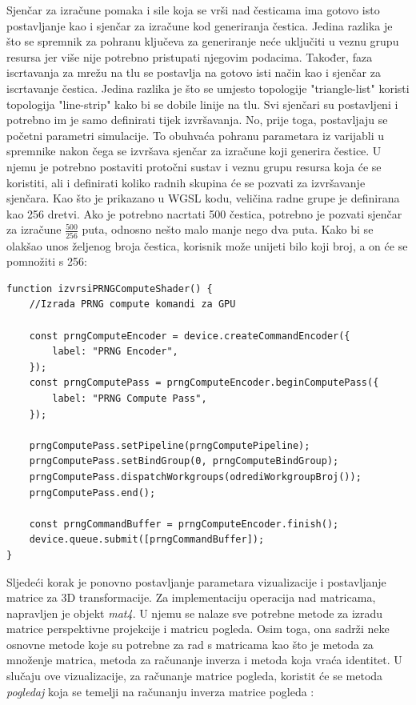 \documentclass{foi}
\begin{document}
Sjenčar za izračune pomaka i sile koja se vrši nad česticama ima gotovo isto postavljanje kao i sjenčar za izračune kod generiranja čestica. Jedina razlika je što se spremnik za pohranu ključeva za generiranje neće uključiti u veznu grupu resursa jer više nije potrebno pristupati njegovim podacima. Također, faza iscrtavanja za mrežu na tlu se postavlja na gotovo isti način kao i sjenčar za iscrtavanje čestica. Jedina razlika je što se umjesto topologije "triangle-list" koristi topologija "line-strip" kako bi se dobile linije na tlu. Svi sjenčari su postavljeni i potrebno im je samo definirati tijek izvršavanja. No, prije toga, postavljaju se početni parametri simulacije. To obuhvaća pohranu parametara iz varijabli u spremnike nakon čega se izvršava sjenčar za izračune koji generira čestice. U njemu je potrebno postaviti protočni sustav i veznu grupu resursa koja će se koristiti, ali i definirati koliko radnih skupina će se pozvati za izvršavanje sjenčara. Kao što je prikazano u WGSL kodu, veličina radne grupe je definirana kao 256 dretvi. Ako je potrebno nacrtati 500 čestica, potrebno je pozvati sjenčar za izračune $\frac{500}{256}$ puta, odnosno nešto malo manje nego dva puta. Kako bi se olakšao unos željenog broja čestica, korisnik može unijeti bilo koji broj, a on će se pomnožiti s 256:
\begin{verbatim}
function izvrsiPRNGComputeShader() {
	//Izrada PRNG compute komandi za GPU
	
	const prngComputeEncoder = device.createCommandEncoder({
		label: "PRNG Encoder",
	});
	const prngComputePass = prngComputeEncoder.beginComputePass({
		label: "PRNG Compute Pass",
	});
	
	prngComputePass.setPipeline(prngComputePipeline);
	prngComputePass.setBindGroup(0, prngComputeBindGroup);
	prngComputePass.dispatchWorkgroups(odrediWorkgroupBroj());
	prngComputePass.end();
	
	const prngCommandBuffer = prngComputeEncoder.finish();
	device.queue.submit([prngCommandBuffer]);
}
\end{verbatim}

Sljedeći korak je ponovno postavljanje parametara vizualizacije i postavljanje matrice za 3D transformacije. Za implementaciju operacija nad matricama, napravljen je objekt \textit{mat4}. U njemu se nalaze sve potrebne metode za izradu matrice perspektivne projekcije i matricu pogleda. Osim toga, ona sadrži neke osnovne metode koje su potrebne za rad s matricama kao što je metoda za množenje matrica, metoda za računanje inverza i metoda koja vraća identitet. U slučaju ove vizualizacije, za računanje matrice pogleda, koristit će se metoda \textit{pogledaj} koja se temelji na računanju inverza matrice pogleda \parencite{WebGPUFundamentalsCameras}:
\end{document}
